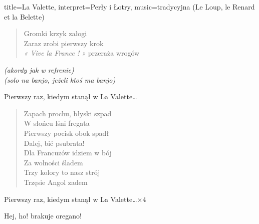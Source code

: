\begin{song}{title={La Valette}, interpret={Perły i Łotry}, music={tradycyjna (Le Loup, le Renard et la Belette)}}
\begin{multicols}{2}
\begin{verse}
        Gromki krzyk załogi \\
        Zaraz zrobi pierwszy krok \\
        \textit{« Vive la France ! »} przeraża wrogów
    \end{verse}
    \begin{interlude}
        \textit{(akordy jak w refrenie)} \\
        \textit{(solo na banjo, jeżeli ktoś ma banjo)}
    \end{interlude}
    \begin{chorus}
        Pierwszy raz, kiedym stanął w La Valette\ldots
    \end{chorus}
    \begin{verse}
        Zapach prochu, błyski szpad \\
        W słońcu lśni fregata \\
        Pierwszy pocisk obok spadł \\
        Dalej, bić psubrata! \smallskip \\
        Dla Francuzów idziem w bój \\
        Za wolności śladem \\
        Trzy kolory to nasz strój \\
        Trzęsie Angol zadem
    \end{verse}
    \begin{chorus}
        Pierwszy raz, kiedym stanął w La Valette\ldots $\times 4$
    \end{chorus}
    \begin{outro}
        Hej, ho! brakuje oregano! \\
          
    \end{outro}
    \vfill\null
    \end{multicols}
\end{song}

